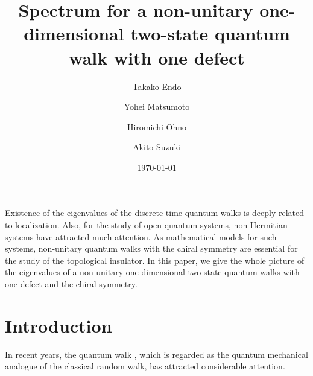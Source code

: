 \documentclass[a4paper,12pt]{article}
\theoremstyle{plain}
\theoremstyle{definition}
\theoremstyle{definition}
\renewenvironment{abstract}
  {{\bfseries\noindent{\abstractname}\par\nobreak}\footnotesize}
  {\bigskip}
\begin{document}
\title{
Spectrum for a non-unitary one-dimensional two-state quantum walk with one defect}



\author[1]{Takako Endo}%
\author[2]{Yohei Matsumoto}%
\author[3]{Hiromichi Ohno}%
\author[4]{Akito Suzuki}%
%
%

\vspace{-1em}

  \date{\today}

\begingroup
\let\center\flushleft
\let\endcenter\endflushleft
\maketitle
\endgroup

\begin{abstract}
Existence of the eigenvalues of the discrete-time quantum walks is deeply related to localization.
Also, for the study of open quantum systems, non-Hermitian systems have attracted much attention. As mathematical models for such systems, non-unitary quantum walks with the chiral symmetry are essential for the study of the topological insulator. In this paper, we give the whole picture of the eigenvalues of a non-unitary one-dimensional two-state quantum walks with one defect and the chiral symmetry.
\end{abstract}

\sloppy

\section{Introduction}
In recent years, the quantum walk , which is regarded as the quantum mechanical analogue of the classical random walk, has attracted considerable attention\cite{AharonovEtAl2001, AmbainisEtAl2001, Kempe2003, Kendon2007, QiangEtAl2024,VAndraca2012}.  
\end{document}

